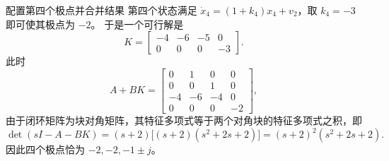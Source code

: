 \documentclass[11pt]{article}
\begin{document}
\begin{solution}
\begin{proofstep}{配置第四个极点并合并结果}
第四个状态满足
$\dot x_4=(1+k_4)x_4+v_2$，取 $k_4=-3$ 即可使其极点为 $-2$。
于是一个可行解是
\[
\boxed{K=\begin{bmatrix}-4&-6&-5&0\\0&0&0&-3\end{bmatrix}.}
\]
此时
\[
A+BK=\begin{bmatrix}0&1&0&0\\0&0&1&0\\-4&-6&-4&0\\0&0&0&-2\end{bmatrix},
\]
由于闭环矩阵为块对角矩阵，其特征多项式等于两个对角块的特征多项式之积，即
\[
\det(sI-A-BK)=(s+2)\bigl[(s+2)(s^2+2s+2)\bigr]
=(s+2)^2(s^2+2s+2).
\]
因此四个极点恰为 $-2,-2,-1\pm j$。
\end{proofstep}
\end{solution}
\end{document}
